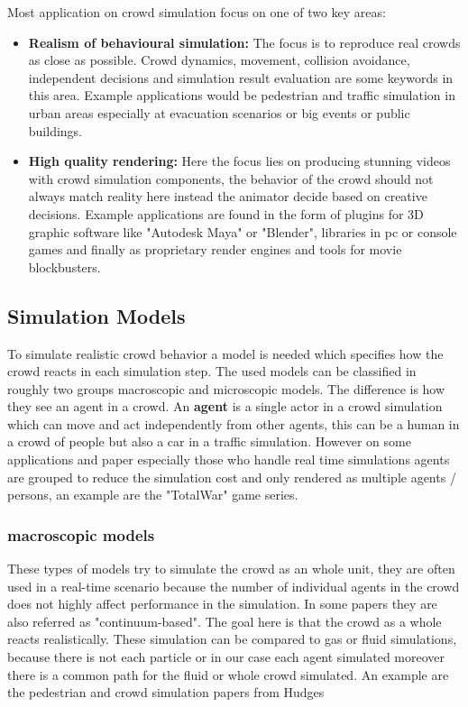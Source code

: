 \documentclass[sigconf]{acmart}
\begin{document}
Most application on crowd simulation focus on one of two key areas: 
\begin{itemize}
\item \textbf{Realism of behavioural simulation:} The focus is to reproduce real crowds as close as possible. Crowd dynamics, movement, collision avoidance, independent decisions and simulation result evaluation are some keywords in this area. Example applications would be pedestrian and traffic simulation in urban areas especially at evacuation scenarios or big events or public buildings.
\item \textbf{High quality rendering:} Here the focus lies on producing stunning videos with crowd simulation components, the behavior of the crowd should not always match reality here instead the animator decide based on creative decisions. Example applications are found in the form of plugins for 3D graphic software like "Autodesk Maya" or "Blender", libraries in pc or console games and finally as proprietary render engines and tools for movie blockbusters.
\end{itemize}

\cite{thalmann_crowd_2013}

\subsection{Simulation Models}
\label{chap:simulationModels}
To simulate realistic crowd behavior a model is needed which specifies how the crowd reacts in each simulation step. The used models can be classified in roughly two groups macroscopic and microscopic models. The difference is how they see an agent in a crowd. An \textbf{agent} is a single actor in a crowd simulation which can move and act independently from other agents, this can be a human in a crowd of people but also a car in a traffic simulation. However on some applications and paper especially those who handle real time simulations agents are grouped to reduce the simulation cost and only rendered as multiple agents / persons, an example are the "TotalWar" \cite{total_war_website} \cite{thalmann_crowd_2013} game series.

\subsubsection{\textbf{macroscopic models}}
These types of models try to simulate the crowd as an whole unit, they are often used in a real-time scenario because the number of individual agents in the crowd does not highly affect performance in the simulation. In some papers they are also referred as "continuum-based"\cite{xu_crowd_2014}. The goal here is that the crowd as a whole reacts realistically. These simulation can be compared to gas or fluid simulations, because there is not each particle or in our case each agent simulated moreover there is a common path for the fluid or whole crowd simulated. An example are the pedestrian and crowd simulation papers from Hudges \cite{hughes_continuum_2002} \cite{hughes_flow_2003}
\end{document}
